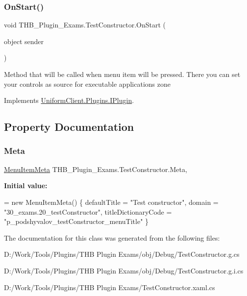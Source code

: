 \subsubsection{\texorpdfstring{On\+Start()}{OnStart()}}
{\footnotesize\ttfamily void T\+H\+B\+\_\+\+Plugin\+\_\+\+Exams.\+Test\+Constructor.\+On\+Start (\begin{DoxyParamCaption}\item[{object}]{sender }\end{DoxyParamCaption})}



Method that will be called when menu item will be pressed. There you can set your controls as source for executable application\textquotesingle{}s zone 



Implements \mbox{\hyperlink{interface_uniform_client_1_1_plugins_1_1_i_plugin_a1ca2220c7ce4a23f8f41af10efccf328}{Uniform\+Client.\+Plugins.\+I\+Plugin}}.



\subsection{Property Documentation}
\mbox{\label{class_t_h_b___plugin___exams_1_1_test_constructor_a85cefaa72576228ed78d6c8702efcc1d}} 
\subsubsection{\texorpdfstring{Meta}{Meta}}
{\footnotesize\ttfamily \mbox{\hyperlink{class_uniform_client_1_1_plugins_1_1_menu_item_meta}{Menu\+Item\+Meta}} T\+H\+B\+\_\+\+Plugin\+\_\+\+Exams.\+Test\+Constructor.\+Meta\hspace{0.3cm}{\ttfamily [get]}, {\ttfamily [set]}}

{\bfseries Initial value\+:}
\begin{DoxyCode}
= \textcolor{keyword}{new} MenuItemMeta() \{
            defaultTitle = \textcolor{stringliteral}{"Test constructor"},
            domain = \textcolor{stringliteral}{"30\_exams.20\_testConstructor"},
            titleDictionaryCode = \textcolor{stringliteral}{"p\_podshyvalov\_testConstructor\_menuTitle"} \}
\end{DoxyCode}


The documentation for this class was generated from the following files\+:\begin{DoxyCompactItemize}
\item 
D\+:/\+Work/\+Tools/\+Plugins/\+T\+H\+B Plugin Exams/obj/\+Debug/Test\+Constructor.\+g.\+cs\item 
D\+:/\+Work/\+Tools/\+Plugins/\+T\+H\+B Plugin Exams/obj/\+Debug/Test\+Constructor.\+g.\+i.\+cs\item 
D\+:/\+Work/\+Tools/\+Plugins/\+T\+H\+B Plugin Exams/Test\+Constructor.\+xaml.\+cs\end{DoxyCompactItemize}
